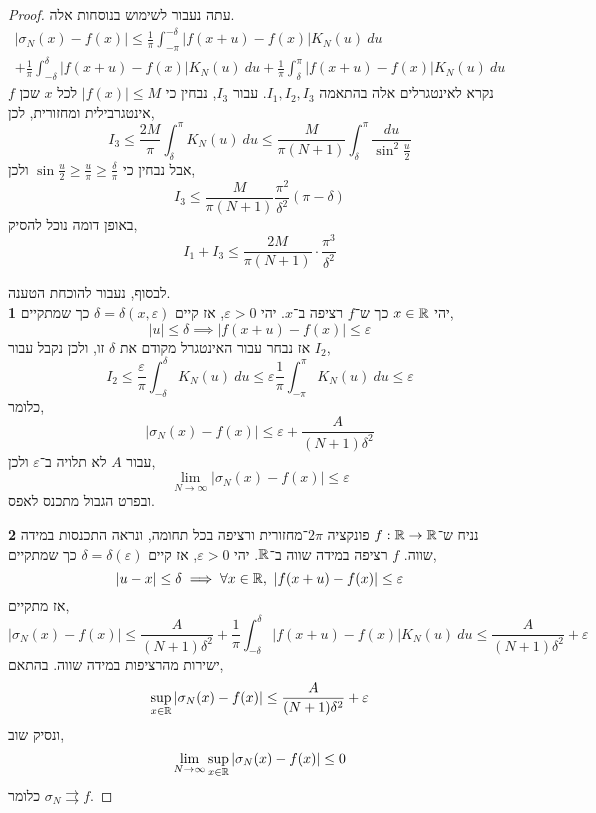 \begin{proof}
	עתה נעבור לשימוש בנוסחות אלה.
	\begin{multline*}
		|\sigma_N(x) - f(x)|
		\le \frac{1}{\pi} \int_{-\pi}^{-\delta} |f(x + u) - f(x)| K_N(u)\ du \\
		+ \frac{1}{\pi} \int_{-\delta}^{\delta} |f(x + u) - f(x)| K_N(u)\ du + \frac{1}{\pi} \int_{\delta}^{\pi} |f(x + u) - f(x)| K_N(u)\ du
	\end{multline*}
	נקרא לאינטגרלים אלה בהתאמה $I_1, I_2, I_3$.
	עבור $I_3$, נבחין כי $|f(x)| \le M$ לכל $x$ שכן $f$ אינטגרבילית ומחזורית, לכן,
	\[
		I_3
		\le \frac{2 M}{\pi} \int_{\delta}^{\pi} K_N(u)\ du
		\le \frac{M}{\pi(N + 1)} \int_{\delta}^{\pi} \frac{du}{\sin^2 \frac{u}{2}}
	\]
	אבל נבחין כי $\sin \frac{u}{2} \ge \frac{u}{\pi} \ge \frac{\delta}{\pi}$ ולכן,
	\[
		I_3
		\le \frac{M}{\pi (N + 1)} \frac{\pi^2}{\delta^2}(\pi - \delta)
	\]
	באופן דומה נוכל להסיק,
	\[
		I_1 + I_3
		\le \frac{2 M}{\pi (N + 1)} \cdot \frac{\pi^3}{\delta^2}
	\]

	לבסוף, נעבור להוכחת הטענה. \\
	\textbf{1}
	יהי $x \in \mathbb{R}$ כך ש־$f$ רציפה ב־$x$.
		יהי $\varepsilon > 0$, אז קיים $\delta = \delta(x, \varepsilon)$ כך שמתקיים,
		\[
			|u|
			\le \delta
			\implies |f(x + u) - f(x)| \le \varepsilon
		\]
		אז נבחר עבור האינטגרל מקודם את $\delta$ זו, ולכן נקבל עבור $I_2$,
		\[
			I_2
			\le \frac{\varepsilon}{\pi} \int_{-\delta}^{\delta} K_N(u)\ du
			\le \varepsilon \frac{1}{\pi} \int_{-\pi}^{\pi} K_N(u)\ du
			\le \varepsilon
		\]
		כלומר,
		\[
			|\sigma_N(x) - f(x)|
			\le \varepsilon + \frac{A}{(N + 1) \delta^2}
		\]
		עבור $A$ לא תלויה ב־$\varepsilon$ ולכן,
		\[
			\lim_{N \to \infty} |\sigma_N(x) - f(x)|
			\le \varepsilon
		\]
		ובפרט הגבול מתכנס לאפס.

		\textbf{2}
		נניח ש־$f : \mathbb{R} \to \mathbb{R}$ פונקציה $2 \pi$־מחזורית ורציפה בכל תחומה, ונראה התכנסות במידה שווה.
		$f$ רציפה במידה שווה ב־$\mathbb{R}$.
		יהי $\varepsilon > 0$, אז קיים $\delta = \delta(\varepsilon)$ כך שמתקיים,
		\[
			|u - x| \le \delta
			\implies \forall x \in \mathbb{R},\ |f(x + u) - f(x)| \le \varepsilon
		\]
		אז מתקיים,
		\[
			|\sigma_N(x) - f(x)|
			\le \frac{A}{(N + 1) \delta^2} + \frac{1}{\pi} \int_{-\delta}^{\delta} |f(x + u) - f(x)| K_N(u)\ du
			\le \frac{A}{(N + 1) \delta^2} + \varepsilon
		\]
		ישירות מהרציפות במידה שווה.
		בהתאם,
		\[
			\sup_{x \in \mathbb{R}} |\sigma_N(x) - f(x)|
			\le \frac{A}{(N + 1) \delta^2} + \varepsilon
		\]
		ונסיק שוב,
		\[
			\lim_{N \to \infty} \sup_{x \in \mathbb{R}} |\sigma_N(x) - f(x)|
			\le 0
		\]
		כלומר $\sigma_N \rightrightarrows f$.
\end{proof}


